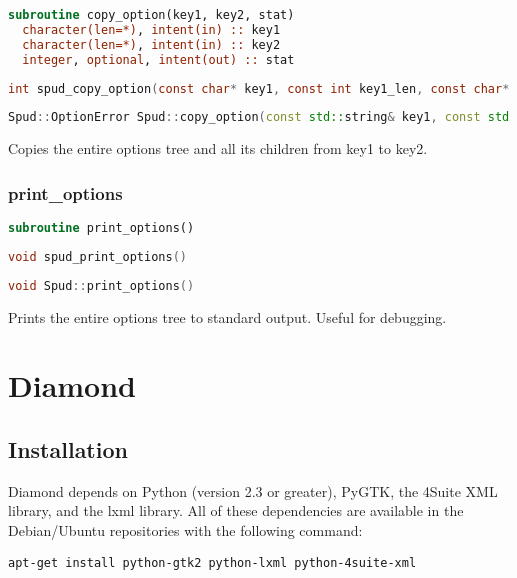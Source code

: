\documentclass[a4paper, 11pt]{book}
\begin{document}
\begin{lstlisting}[language=fortran]
subroutine copy_option(key1, key2, stat)
  character(len=*), intent(in) :: key1
  character(len=*), intent(in) :: key2
  integer, optional, intent(out) :: stat
\end{lstlisting}

\begin{lstlisting}[language=C]
int spud_copy_option(const char* key1, const int key1_len, const char* key2, const int key2_len)
\end{lstlisting}

\begin{lstlisting}[language=C++]
Spud::OptionError Spud::copy_option(const std::string& key1, const std::string& key2)
\end{lstlisting}

Copies the entire options tree and all its children from key1 to key2.

\subsection{print\_options}

\begin{lstlisting}[language=fortran]
subroutine print_options()
\end{lstlisting}

\begin{lstlisting}[language=C]
void spud_print_options()
\end{lstlisting}

\begin{lstlisting}[language=C++]
void Spud::print_options()
\end{lstlisting}

Prints the entire options tree to standard output. Useful for debugging.

\chapter{Diamond}

\section{Installation}
Diamond depends on Python (version 2.3 or greater), PyGTK,
the 4Suite XML library, and the lxml library. All of these dependencies
are available in the Debian/Ubuntu repositories with the following command:
\begin{verbatim}
apt-get install python-gtk2 python-lxml python-4suite-xml
\end{verbatim}
\end{document}
